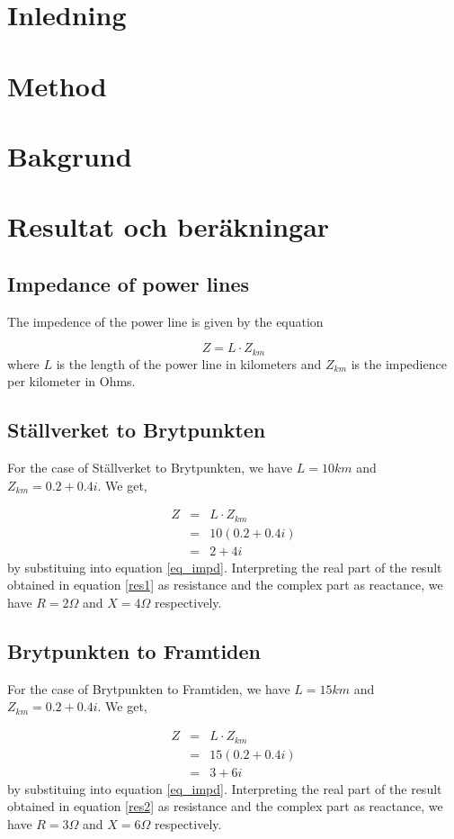 \documentclass{report}
\title{}
\date{\today}
\author{Johanna Sörbom}
\newcommand{\case}[1]{\subsection*{#1}}
\newcommand{\cmp}[2]{\ensuremath{#1+#2i}}
\begin{document}
\maketitle
\section{Inledning}
\section{Method}
\section{Bakgrund}
\section{Resultat och beräkningar}
\subsection{Impedance of power lines}
The impedence of the power line is given by the equation 

\begin{equation}\label{eq_impd}
Z =  L \cdot Z_{km}
\end{equation} where $L$ is the length of the power line in kilometers and $Z_{km}$ is the impedience per kilometer in Ohms.

\case{Ställverket to Brytpunkten}
For the case of Ställverket to Brytpunkten, we have $L=10km$ and $Z_{km}=\cmp{0.2}{0.4}$.  We get,

\begin{eqnarray}
Z&=&  L \cdot Z_{km} \\
&=&10 (\cmp{0.2}{0.4}) \\
&=& \cmp{2}{4} \label{res1}
\end{eqnarray} by substituing into equation \ref{eq_impd}. Interpreting the real part of the result obtained in equation \ref{res1} as resistance and the complex part as reactance, we have $R=2\Omega$ and $X=4\Omega$ respectively.

\case {Brytpunkten to Framtiden}
For the case of Brytpunkten to Framtiden, we have $L=15km$ and $Z_{km}=\cmp{0.2}{0.4}$.  We get,

\begin{eqnarray}
Z&=&  L \cdot Z_{km} \\
&=&15 (\cmp{0.2}{0.4}) \\
&=& \cmp{3}{6} \label{res2}
\end{eqnarray} by substituing into equation \ref{eq_impd}. Interpreting the real part of the result obtained in equation \ref{res2} as resistance and the complex part as reactance, we have $R=3\Omega$ and $X=6\Omega$ respectively.
\end{document}
